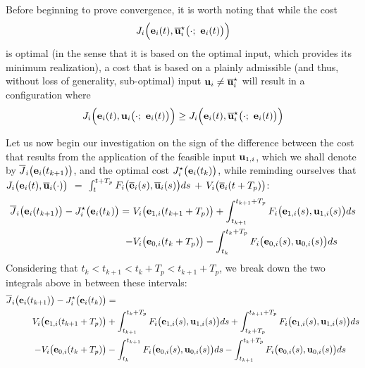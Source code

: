 Before beginning to prove convergence, it is worth noting that while the cost
$$J_i \Big(\vect{e}_i(t), \overline{\vect{u}}_i^{\star}\big(\cdot;\ \vect{e}_i(t)\big)\Big)$$
is optimal (in the sense that it is based on the optimal input, which provides
its minimum realization), a cost that is based on a plainly admissible
(and thus, without loss of generality, sub-optimal) input
$\bm{\mathbf{u}}_i \not= \overline{\bm{\mathbf{u}}}_i^{\star}$ will result in a configuration where
\begin{equation}
J_i \Big(\vect{e}_i(t), \vect{u}_i\big(\cdot;\ \vect{e}_i(t)\big)\Big)
\geq J_i \Big(\vect{e}_i(t), \overline{\vect{u}}_i^{\star}\big(\cdot;\ \vect{e}_i(t)\big)\Big)
\end{equation}

Let us now begin our investigation on the sign of the difference between the cost
that results from the application of the feasible input $\bm{\mathbf{u}}_{1,i}$,
which we shall denote by $\overline{J}_i\big(\bm{\mathbf{e}}_i(t_{k+1})\big)$,
and the optimal cost $J_i^{\star}\big(\bm{\mathbf{e}}_i(t_k)\big)$, while reminding
ourselves that
$J_i \big(\bm{\mathbf{e}}_i(t), \overline{\bm{\mathbf{u}}}_i (\cdot)\big)$ $=$
$\int_{t}^{t + T_p} F_i \big(\overline{\bm{\mathbf{e}}}_i(s), \overline{\bm{\mathbf{u}}}_i (s)\big) ds$ $+$
$V_i \big(\overline{\bm{\mathbf{e}}}_i (t + T_p)\big)$:
\begin{align}
  \overline{J}_i\big(\bm{\mathbf{e}}_i(t_{k+1})\big) - J_i^{\star}\big(\bm{\mathbf{e}}_i(t_k)\big) =\
   & V_i \big(\bm{\mathbf{e}}_{1,i} (t_{k+1} + T_p)\big) + \int_{t_{k+1}}^{t_{k+1} + T_p} F_i \big(\bm{\mathbf{e}}_{1,i}(s), \bm{\mathbf{u}}_{1,i} (s)\big) ds \\
  -&V_i \big(\bm{\mathbf{e}}_{0,i} (t_k + T_p)\big) - \int_{t_k}^{t_k + T_p} F_i \big(\bm{\mathbf{e}}_{0,i}(s), \bm{\mathbf{u}}_{0,i} (s)\big) ds
\end{align}
Considering that $t_k < t_{k+1} < t_k + T_p < t_{k+1} + T_p$, we break down the
two integrals above in between these intervals:
\begin{align}
  \overline{J}_i\big(\bm{\mathbf{e}}_i(t_{k+1})\big) - J_i^{\star}\big(\bm{\mathbf{e}}_i(t_k)\big) &= \\
    V_i \big(\bm{\mathbf{e}}_{1,i} (t_{k+1} + T_p)\big)
    &+ \int_{t_{k+1}}^{t_k + T_p} F_i \big(\bm{\mathbf{e}}_{1,i}(s), \bm{\mathbf{u}}_{1,i} (s)\big) d s
    + \int_{t_k + T_p}^{t_{k+1} + T_p} F_i \big(\bm{\mathbf{e}}_{1,i}(s), \bm{\mathbf{u}}_{1,i} (s)\big) d s \\
    -V_i \big(\bm{\mathbf{e}}_{0,i} (t_k + T_p)\big)
    &- \int_{t_k}^{t_{k+1}} F_i \big(\bm{\mathbf{e}}_{0,i}(s), \bm{\mathbf{u}}_{0,i} (s)\big) d s
    - \int_{t_{k+1}}^{t_k + T_p} F_i \big(\bm{\mathbf{e}}_{0,i}(s), \bm{\mathbf{u}}_{0,i} (s)\big) d s
\label{eq:convergence_4_integrals_2}
\end{align}

